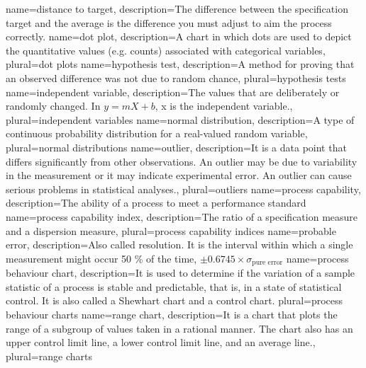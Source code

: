 {
    name={distance to target},
    description={The difference between the specification target and the average is the difference you must adjust to aim the process correctly.}
}
{
    name={dot plot},
    description={A chart in which dots are used to depict the quantitative values (e.g. counts) associated with categorical variables},
    plural={dot plots}
}
{
    name={hypothesis test},
    description={A method for proving that an observed difference was not due to random chance},
    plural={hypothesis tests}
}
{
    name={independent variable},
    description={The values that are deliberately or randomly changed. In $y = mX + b$, x is the independent variable.},
    plural={independent variables}
}
{
    name={normal distribution},
    description={A type of continuous probability distribution for a real-valued random variable},
    plural={normal distributions}
}
{
    name={outlier},
    description={It is a data point that differs significantly from other observations. An outlier may be due to variability in the measurement or it may indicate experimental error. An outlier can cause serious problems in statistical analyses.},
    plural={outliers}
}
{
    name={process capability},
    description={The ability of a process to meet a performance standard}
}
{
    name={process capability index},
    description={The ratio of a specification measure and a dispersion measure},
    plural={process capability indices}
}
{
    name={probable error},
    description={Also called resolution. It is the interval within which a single measurement might occur 50 \% of the time, $\pm 0.6745 \times \sigma_\text{pure error}$}
}
{
    name={process behaviour chart},
    description={It is used to determine if the variation of a sample statistic of a process is stable and predictable, that is, in a state of statistical control. It is also called a Shewhart chart and a control chart.}
    plural={process behaviour charts}
}
{
    name={range chart},
    description={It is a chart that plots the range of a subgroup of values taken in a rational manner. The chart also has an upper control limit line, a lower control limit line, and an average line.},
    plural={range charts}
}
